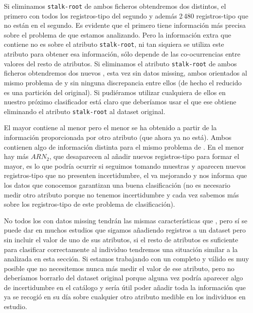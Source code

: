 Si eliminamos \texttt{stalk-root} de ambos ficheros obtendremos dos \CCs distintos, el primero con todos los registros-tipo del segundo y además 2\,480 registros-tipo que no están en el segundo. Es evidente que el primero tiene información más precisa sobre el problema de \clasificacion que estamos analizando. Pero la información extra que contiene no es sobre el atributo \texttt{stalk-root}, ni tan siquiera se utiliza este atributo para obtener esa información, sólo depende de las co-ocurrencias entre valores del resto de atributos. Si eliminamos el atributo \texttt{stalk-root} de ambos ficheros obtendremos dos nuevos \CCs, esta vez sin datos missing, ambos orientados al mismo problema de \clasificacion y sin ninguna discrepancia entre ellos (de hecho el reducido es una partición del original). Si pudiéramos utilizar cualquiera de ellos en nuestro próximo clasificador está claro que deberíamos usar el \CC que ese obtiene eliminando el atributo \texttt{stalk-root} al dataset original.

El \CC mayor contiene al menor pero el menor se ha obtenido a partir de la información proporcionada por otro atributo (que ahora ya no está). Ambos contienen algo de información distinta para el mismo problema de \clasificacion. En el menor hay más $ARN_2$, que desaparecen al añadir nuevos registros-tipo para formar el mayor, es lo que podría ocurrir si seguimos tomando muestras y aparecen nuevos registros-tipo que no presenten incertidumbre, el \CC va mejorando y nos informa que los datos que conocemos garantizan una buena clasificación (no es necesario medir otro atributo porque no tenemos incertidumbre y cada vez sabemos más sobre los registros-tipo de este problema de clasificación).







No todos los \catalogos con datos missing tendrán las mismas características que \mushroom, pero sí se puede dar en muchos estudios que sigamos añadiendo registros a un dataset pero sin incluir el valor de uno de sus atributos, si el resto de atributos es suficiente para clasificar correctamente al individuo tendremos una situación similar a la analizada en esta sección. Si estamos trabajando con un \CC completo y válido es muy posible que no necesitemos nunca más medir el valor de ese atributo, pero no deberíamos borrarlo del dataset original porque alguna vez podría aparecer algo de incertidumbre en el catálogo y sería útil poder añadir toda la información que ya se recogió en su día sobre cualquier otro atributo medible en los individuos en estudio.

